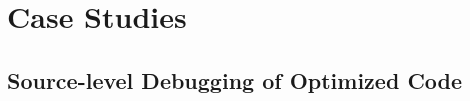 \chapter{Case Studies}
\label{ch:case-studies}

\missing




\section{Source-level Debugging of Optimized Code}